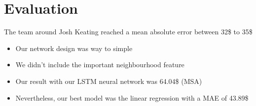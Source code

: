 \documentclass{beamer}
\begin{document}
\section{Evaluation}
\begin{frame}
The team around Josh Keating reached a mean absolute error between 32\$ to 35\$
\begin{itemize}
\item Our network design was way to simple
\item We didn't include the important neighbourhood feature
\item Our result with our LSTM neural network was 64.04\$ (MSA)
\item Nevertheless, our best model was the linear regression with a MAE of 43.89\$
\end{itemize}
\end{frame}

\end{document}
